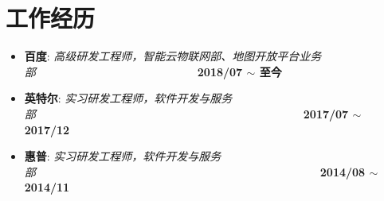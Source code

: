 \documentclass[letterpaper, UTF8, 11pt]{article}
\begin{document}
	\section*{\textbf{工作经历}}\vspace{-0.12in}
	\begin{itemize}
		\item \textbf{百度}: \emph{高级研发工程师，智能云物联网部、地图开放平台业务部}~~~~~~~~~~~~~~~~~~~~~~~~~~~~~\textbf{2018/07 $\sim$ 至今}
		\item \textbf{英特尔}: \emph{实习研发工程师，软件开发与服务部}~~~~~~~~~~~~~~~~~~~~~~~~~~~~~~~~~~~~~~~~~~~~~~~~\textbf{2017/07 $\sim$ 2017/12}
		\item \textbf{惠普}: \emph{实习研发工程师，软件开发与服务部}~~~~~~~~~~~~~~~~~~~~~~~~~~~~~~~~~~~~~~~~~~~~~~~~~~~\textbf{2014/08 $\sim$ 2014/11}
	\end{itemize}
	\vspace{-0.32in}
	
\end{document}
